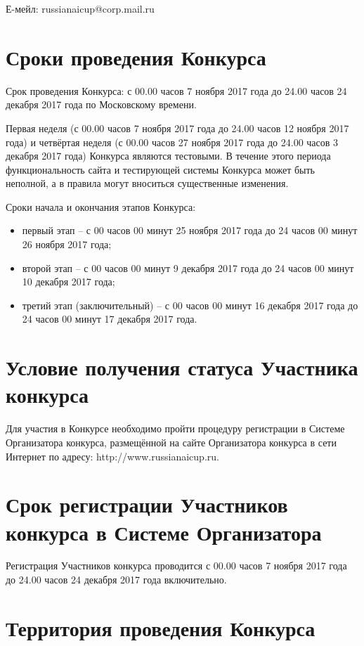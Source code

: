 Е-мейл: russianaicup@corp.mail.ru

\section{Сроки проведения Конкурса}

Срок проведения Конкурса: с 00.00 часов 7 ноября 2017 года до 24.00 часов 24 декабря 2017 года по Московскому времени.

Первая неделя (с 00.00 часов 7 ноября 2017 года до 24.00 часов 12 ноября 2017 года) и четвёртая неделя (с 00.00 часов 27 ноября 2017 года до
24.00 часов 3 декабря 2017 года) Конкурса являются тестовыми. В течение этого периода функциональность сайта и тестирующей системы Конкурса
может быть неполной, а в правила могут вноситься существенные изменения.

Сроки начала и окончания этапов Конкурса:
\begin{itemize}
\item первый этап – с 00 часов 00 минут 25 ноября 2017 года до 24 часов 00 минут 26 ноября 2017 года;
\item второй этап – с 00 часов 00 минут 9 декабря 2017 года до 24 часов 00 минут 10 декабря 2017 года;
\item третий этап (заключительный) – с 00 часов 00 минут 16 декабря 2017 года до 24 часов 00 минут 17 декабря 2017 года.
\end{itemize}

\section{Условие получения статуса Участника конкурса}

Для участия в Конкурсе необходимо пройти процедуру регистрации в Системе Организатора конкурса, размещённой на сайте Организатора конкурса в
сети Интернет по адресу: http://www.russianaicup.ru.

\section{Срок регистрации Участников конкурса в Системе Организатора}

Регистрация Участников конкурса проводится с 00.00 часов 7 ноября 2017 года до 24.00 часов 24 декабря 2017 года включительно.

\section{Территория проведения Конкурса}


